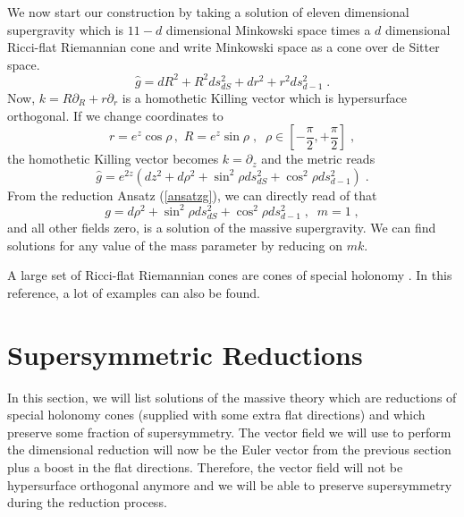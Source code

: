 \documentclass[a4paper,12pt]{article}
\newcommand{\ft}[2]{{\textstyle\frac{#1}{#2}}}
\begin{document}
We now start our construction by taking a solution of eleven dimensional supergravity which is $11-d$ dimensional Minkowski space times a $d$ dimensional Ricci-flat Riemannian cone and write Minkowski space as a cone over de Sitter space.
\begin{equation}\label{g2}
\hat{g}=dR^2+R^2ds^2_{dS}+dr^2+r^2 ds^2_{d-1}\; .
\end{equation}
Now, $k=R\partial_R+r\partial_r$ is a homothetic Killing vector which is hypersurface orthogonal.
If we change coordinates to
\begin{equation}
r=e^z \cos \rho\, , \, \, R=e^z \sin \rho\; , \;\; \rho \in [-\ft{\pi}2,+\ft{\pi}2] \; ,
\end{equation}
the homothetic Killing vector becomes $k=\partial_z$ and the metric reads
\begin{equation}
\hat{g}=e^{2z}\left(dz^2+d\rho^2+\sin^2 \rho ds_{dS}^2+\cos^2 \rho ds^2_{d-1} \right) \; .
\end{equation}
From the reduction Ansatz (\ref{ansatzg}), we can directly read of that 
\begin{equation}
g=d\rho^2+\sin^2 \rho ds_{dS}^2+\cos^2 \rho ds^2_{d-1}\; , \; \; m=1 \; ,
\end{equation}
and all other fields zero, is a solution of the massive supergravity. We can find solutions for any value of the mass parameter by reducing on $mk$.

A large set of Ricci-flat Riemannian cones are cones of special holonomy \cite{Acharya:1998db}. In this reference, a lot of examples can also be found. 
\section{Supersymmetric Reductions}\label{susy}
In this section, we will list solutions of the massive theory which are reductions of special holonomy cones (supplied with some extra flat directions) and which preserve some fraction of supersymmetry. The vector field we will use to perform the dimensional reduction will now be the Euler vector from the previous section plus a boost in the flat directions. Therefore, the vector field will not be hypersurface orthogonal anymore and we will be able to preserve supersymmetry during the reduction process. 
\end{document}
